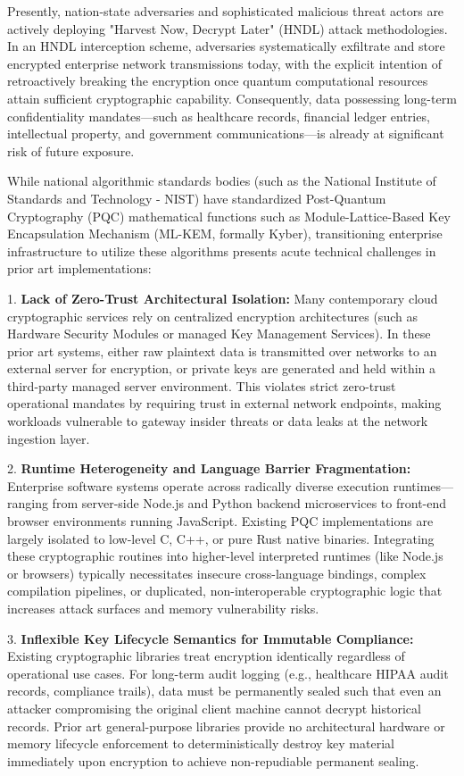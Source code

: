 \documentclass[12pt, a4paper]{article}
\begin{document}
Presently, nation-state adversaries and sophisticated malicious threat actors are actively deploying "Harvest Now, Decrypt Later" (HNDL) attack methodologies. In an HNDL interception scheme, adversaries systematically exfiltrate and store encrypted enterprise network transmissions today, with the explicit intention of retroactively breaking the encryption once quantum computational resources attain sufficient cryptographic capability. Consequently, data possessing long-term confidentiality mandates—such as healthcare records, financial ledger entries, intellectual property, and government communications—is already at significant risk of future exposure.

While national algorithmic standards bodies (such as the National Institute of Standards and Technology - NIST) have standardized Post-Quantum Cryptography (PQC) mathematical functions such as Module-Lattice-Based Key Encapsulation Mechanism (ML-KEM, formally Kyber), transitioning enterprise infrastructure to utilize these algorithms presents acute technical challenges in prior art implementations:

1. \textbf{Lack of Zero-Trust Architectural Isolation:} Many contemporary cloud cryptographic services rely on centralized encryption architectures (such as Hardware Security Modules or managed Key Management Services). In these prior art systems, either raw plaintext data is transmitted over networks to an external server for encryption, or private keys are generated and held within a third-party managed server environment. This violates strict zero-trust operational mandates by requiring trust in external network endpoints, making workloads vulnerable to gateway insider threats or data leaks at the network ingestion layer.

2. \textbf{Runtime Heterogeneity and Language Barrier Fragmentation:} Enterprise software systems operate across radically diverse execution runtimes—ranging from server-side Node.js and Python backend microservices to front-end browser environments running JavaScript. Existing PQC implementations are largely isolated to low-level C, C++, or pure Rust native binaries. Integrating these cryptographic routines into higher-level interpreted runtimes (like Node.js or browsers) typically necessitates insecure cross-language bindings, complex compilation pipelines, or duplicated, non-interoperable cryptographic logic that increases attack surfaces and memory vulnerability risks.

3. \textbf{Inflexible Key Lifecycle Semantics for Immutable Compliance:} Existing cryptographic libraries treat encryption identically regardless of operational use cases. For long-term audit logging (e.g., healthcare HIPAA audit records, compliance trails), data must be permanently sealed such that even an attacker compromising the original client machine cannot decrypt historical records. Prior art general-purpose libraries provide no architectural hardware or memory lifecycle enforcement to deterministically destroy key material immediately upon encryption to achieve non-repudiable permanent sealing.
\end{document}
